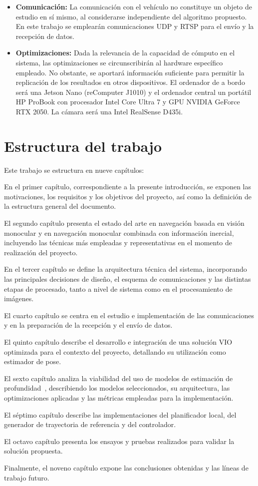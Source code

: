 \begin{itemize}
        se definirá como un radio centrado en la posición del ordenador central.
        \item \textbf{Comunicación:} La comunicación con el vehículo no constituye un objeto de estudio en sí mismo, al considerarse 
        independiente del algoritmo propuesto. En este trabajo se emplearán comunicaciones UDP y RTSP para el envío y la recepción de datos.
        \item \textbf{Optimizaciones:} Dada la relevancia de la capacidad de cómputo en el sistema, las optimizaciones se circunscribirán 
        al hardware específico empleado. No obstante, se aportará información suficiente para permitir la replicación de los resultados en 
        otros dispositivos. El ordenador de a bordo será una Jetson Nano (reComputer J1010) y el ordenador central un portátil HP ProBook 
        con procesador Intel Core Ultra 7 y GPU NVIDIA GeForce RTX 2050. La cámara será una Intel RealSense D435i.
    \end{itemize}
\clearpage
\section{Estructura del trabajo}
    Este trabajo se estructura en nueve capítulos:

    En el primer capítulo, correspondiente a la presente introducción, se exponen las motivaciones, los requisitos y los objetivos del 
    proyecto, así como la definición de la estructura general del documento.
    
    El segundo capítulo presenta el estado del arte en navegación basada en visión monocular y en navegación monocular combinada con 
    información inercial, incluyendo las técnicas más empleadas y representativas en el momento de realización del proyecto.
    
    En el tercer capítulo se define la arquitectura técnica del sistema, incorporando las principales decisiones de diseño, el esquema de 
    comunicaciones y las distintas etapas de procesado, tanto a nivel de sistema como en el procesamiento de imágenes.
    
    El cuarto capítulo se centra en el estudio e implementación de las comunicaciones y en la preparación de la recepción y el envío de datos.
    
    El quinto capítulo describe el desarrollo e integración de una solución VIO optimizada para el contexto del proyecto, detallando 
    su utilización como estimador de pose.

    El sexto capítulo analiza la viabilidad del uso de modelos de estimación de profundidad~\cite{estudio-nav2D}, 
    describiendo los modelos seleccionados, su arquitectura, las optimizaciones aplicadas y las métricas empleadas para la implementación.
    
    El séptimo capítulo describe las implementaciones del planificador local, del generador de trayectoria de referencia y del controlador.
    
    El octavo capítulo presenta los ensayos y pruebas realizados para validar la solución propuesta.
    
    Finalmente, el noveno capítulo expone las conclusiones obtenidas y las líneas de trabajo futuro.

